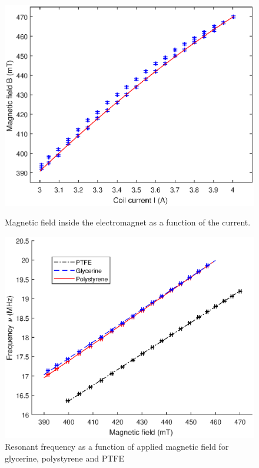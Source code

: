 \documentclass[a4paper]{jpconf}
\numberwithin{equation}{section}
\begin{document}
\begin{figure}[htbp]
	\begin{minipage}[b]{2.9in}
		\includegraphics[scale=0.55]{NMR_calibration_nocaption_nolegend_red.eps}
		\caption{Magnetic field inside the electromagnet as a function of the current.}
		\label{fig: hysteresis curve}
	\end{minipage}
	\hspace{1.5pc}
	\begin{minipage}[b]{3.1in}
		\includegraphics[scale=0.55]{NMR_resonances.eps}
		\caption{Resonant frequency as a function of applied magnetic field for glycerine, polystyrene and PTFE}
		\label{fig: NMR resonances}
	\end{minipage}
\end{figure}
\end{document}
